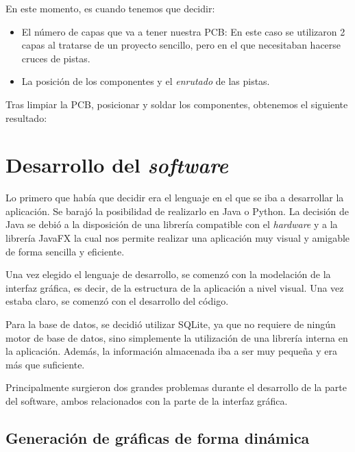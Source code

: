 En este momento, es cuando tenemos que decidir:

\begin{itemize}
\item
El número de capas que va a tener nuestra PCB: En este caso se utilizaron 2 capas al tratarse de un proyecto sencillo, pero en el que necesitaban hacerse cruces de pistas.
\item
La posición de los componentes y el \textit{enrutado} de las pistas.
\end{itemize}





Tras limpiar la PCB, posicionar y soldar los componentes, obtenemos el siguiente resultado:



\section{Desarrollo del \emph{software}}

Lo primero que había que decidir era el lenguaje en el que se iba a desarrollar la aplicación. Se barajó la posibilidad de realizarlo en Java o Python. La decisión de Java se debió a la disposición de una librería compatible con el \emph{hardware} y a la librería JavaFX la cual nos permite realizar una aplicación muy visual y amigable de forma sencilla y eficiente.

Una vez elegido el lenguaje de desarrollo, se comenzó con la modelación de la interfaz gráfica, es decir, de la estructura de la aplicación a nivel visual. Una vez estaba claro, se comenzó con el desarrollo del código.

Para la base de datos, se decidió utilizar SQLite, ya que no requiere de ningún motor de base de datos, sino simplemente la utilización de una librería interna en la aplicación. Además, la información almacenada iba a ser muy pequeña y era más que suficiente.

Principalmente surgieron dos grandes problemas durante el desarrollo de la parte del software, ambos relacionados con la parte de la interfaz gráfica.

\subsection{Generación de gráficas de forma dinámica}\label{generacion_de_graficas_de_forma_dinamica}


